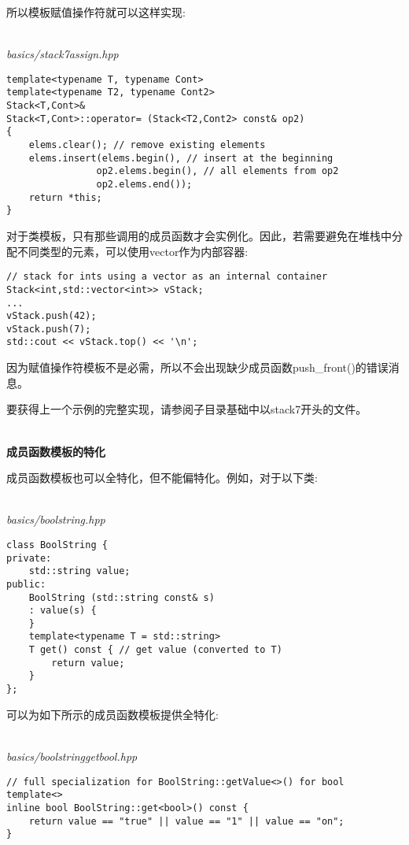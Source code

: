 所以模板赋值操作符就可以这样实现:

\hspace*{\fill} \\ %
\noindent
\textit{basics/stack7assign.hpp}
\begin{lstlisting}[style=styleCXX]
template<typename T, typename Cont>
template<typename T2, typename Cont2>
Stack<T,Cont>&
Stack<T,Cont>::operator= (Stack<T2,Cont2> const& op2)
{
	elems.clear(); // remove existing elements
	elems.insert(elems.begin(), // insert at the beginning
				op2.elems.begin(), // all elements from op2
				op2.elems.end());
	return *this;
}
\end{lstlisting}

对于类模板，只有那些调用的成员函数才会实例化。因此，若需要避免在堆栈中分配不同类型的元素，可以使用vector作为内部容器:

\begin{lstlisting}[style=styleCXX]
// stack for ints using a vector as an internal container
Stack<int,std::vector<int>> vStack;
...
vStack.push(42);
vStack.push(7);
std::cout << vStack.top() << '\n';
\end{lstlisting}

因为赋值操作符模板不是必需，所以不会出现缺少成员函数push\_front()的错误消息。

要获得上一个示例的完整实现，请参阅子目录基础中以stack7开头的文件。

\hspace*{\fill} \\ %
\noindent
\textbf{成员函数模板的特化}

成员函数模板也可以全特化，但不能偏特化。例如，对于以下类:

\hspace*{\fill} \\ %
\noindent
\textit{basics/boolstring.hpp}
\begin{lstlisting}[style=styleCXX]
class BoolString {
private:
	std::string value;
public:
	BoolString (std::string const& s)
	: value(s) {
	}
	template<typename T = std::string>
	T get() const { // get value (converted to T)
		return value;
	}
};
\end{lstlisting}

可以为如下所示的成员函数模板提供全特化:

\hspace*{\fill} \\ %
\noindent
\textit{basics/boolstringgetbool.hpp}
\begin{lstlisting}[style=styleCXX]
// full specialization for BoolString::getValue<>() for bool
template<>
inline bool BoolString::get<bool>() const {
	return value == "true" || value == "1" || value == "on";
}
\end{lstlisting}

